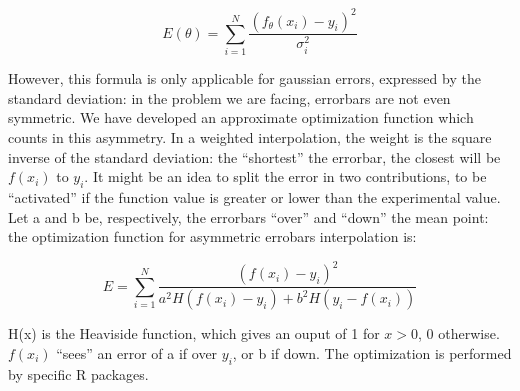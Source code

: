 $$
E(\theta)= \sum_{i=1}^{N} \frac{(f_{\theta}(x_i)-y_i)^2}{\sigma_{i}^2}
$$


However, this formula is only applicable for gaussian errors, expressed by the standard deviation: in the problem we are facing, errorbars are not even symmetric.
We have developed an approximate optimization function which counts in this asymmetry.
In a weighted interpolation, the weight is the square inverse of the standard deviation: the ``shortest'' the errorbar, the closest will be $f(x_i)$ to $y_i$.
It might be an idea to split the error in two contributions, to be ``activated'' if the function value is greater or lower than the experimental value.
Let a and b be, respectively, the errorbars ``over'' and ``down'' the mean point: the optimization function for asymmetric errobars interpolation is:

$$
E= \sum_{i=1}^{N} \frac{(f(x_i)-y_i)^2}{a^{2}H(f(x_i)-y_i)+b^{2}H(y_i-f(x_i))}
$$

H(x) is the Heaviside function, which gives an ouput of 1 for $x>0$, 0 otherwise.\\
$f(x_i)$ ``sees'' an error of a if over $y_i$, or b if down.
The optimization is performed by specific R packages.
